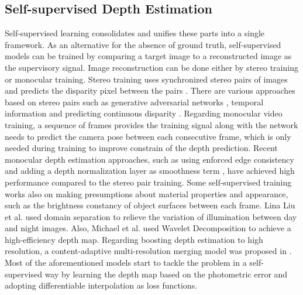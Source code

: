 \documentclass[journal]{IEEEtran}
\begin{document}
\subsection{Self-supervised Depth Estimation}
Self-supervised learning consolidates and unifies these parts into a single framework. As an alternative for the absence of ground truth, self-supervised models can be trained by comparing a target image to a reconstructed image as the supervisory signal. Image reconstruction can be done either by stereo training or monocular training. Stereo training uses synchronized stereo pairs of images and predicts the disparity pixel between the pairs \cite{Xie2016}. There are various approaches based on stereo pairs such as generative adversarial networks \cite{Aleotti,Pilzer2018}, temporal information \cite{Zhan2018,MadhuBabu2018} and predicting continuous disparity \cite{Garg2016}. Regarding monocular video training, a sequence of frames provides the training signal along with the network needs to predict the camera pose between each consecutive frame, which is only needed during training to improve constrain of the depth prediction. Recent monocular depth estimation approaches, such as using enforced edge consistency \cite{Yang2018} and adding a depth normalization layer as smoothness term \cite{Godard2017}, have achieved high performance compared to the stereo pair training. Some self-supervised training works also on making presumptions about material properties and appearance, such as the brightness constancy of object surfaces between each frame. Lina Liu et al. \cite{Liu2021} used domain separation to relieve the variation of illumination between day and night images. Also, Michael et al. \cite{Ramamon2021} used Wavelet Decomposition to achieve a high-efficiency depth map. Regarding boosting depth estimation to high resolution, a content-adaptive multi-resolution merging model was proposed in \cite{Miangoleh2021}. Most of the aforementioned models start to tackle the problem in a self-supervised way by learning the depth map based on the photometric error and adopting differentiable interpolation \cite{Zhou2017,Yin,Wang,Mahjourian,Godard2018,Gordon} as loss functions.
\end{document}
